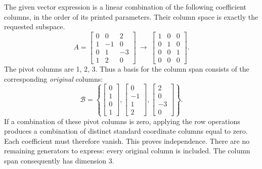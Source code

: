 The given vector expression is a linear combination of the following coefficient columns, in the order of its printed parameters. Their column space is exactly the requested subspace.
\[A=\left[\begin{array}{rrr}0&0&2\\1&-1&0\\0&1&-3\\1&2&0\end{array}\right]\ \longrightarrow\ \left[\begin{array}{rrr}1&0&0\\0&1&0\\0&0&1\\0&0&0\end{array}\right].\]
The pivot columns are 1, 2, 3. Thus a basis for the column span consists of the corresponding \emph{original} columns:
\[\mathcal B=\left\{\left[\begin{array}{r}0\\1\\0\\1\end{array}\right],\left[\begin{array}{r}0\\-1\\1\\2\end{array}\right],\left[\begin{array}{r}2\\0\\-3\\0\end{array}\right]\right\}.\]
If a combination of these pivot columns is zero, applying the row operations produces a combination of distinct standard coordinate columns equal to zero. Each coefficient must therefore vanish. This proves independence. There are no remaining generators to express: every original column is included. The column span consequently has dimension $3$.

